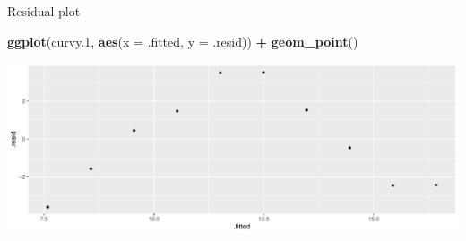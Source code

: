 \documentclass[
  ignorenonframetext,
]{beamer}
\newenvironment{Shaded}{\begin{snugshade}}{\end{snugshade}}
\newcommand{\DataTypeTok}[1]{\textcolor[rgb]{0.13,0.29,0.53}{#1}}
\newcommand{\FloatTok}[1]{\textcolor[rgb]{0.00,0.00,0.81}{#1}}
\newcommand{\KeywordTok}[1]{\textcolor[rgb]{0.13,0.29,0.53}{\textbf{#1}}}
\newcommand{\NormalTok}[1]{#1}
\newcommand{\OperatorTok}[1]{\textcolor[rgb]{0.81,0.36,0.00}{\textbf{#1}}}
\newcommand{\StringTok}[1]{\textcolor[rgb]{0.31,0.60,0.02}{#1}}
\begin{document}
\begin{frame}[fragile]{Residual plot}
\protect\hypertarget{residual-plot-1}{}

\begin{Shaded}
\begin{Highlighting}[]
\KeywordTok{ggplot}\NormalTok{(curvy}\FloatTok{.1}\NormalTok{, }\KeywordTok{aes}\NormalTok{(}\DataTypeTok{x =}\NormalTok{ .fitted, }\DataTypeTok{y =}\NormalTok{ .resid)) }\OperatorTok{+}\StringTok{ }\KeywordTok{geom_point}\NormalTok{()}
\end{Highlighting}
\end{Shaded}

\includegraphics{slides_d29_files/figure-beamer/altoadige-1.pdf}

\end{frame}
\end{document}
